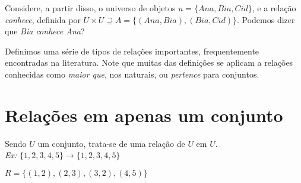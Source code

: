 Considere, a partir disso, o universo de objetos $u = \{Ana, Bia, Cid\}$, e a relação \textit{conhece}, definida por $U\times U \supseteq A = \{(Ana, Bia), (Bia, Cid)\}$. Podemos dizer que \textit{Bia conhece Ana}?



\theoremstyle{definition}
\newtheorem{definition}{Definição}[section]


\theoremstyle{plain}
\newtheorem{theorem}{Proposição}[section]


Definimos uma série de tipos de relações importantes, frequentemente encontradas na literatura.
Note que muitas das definições se aplicam a relações conhecidas como \textit{maior que}, nos naturais, ou \textit{pertence} para conjuntos.

\section{Relações em apenas um conjunto}

Sendo $U$ um conjunto, trata-se de uma relação de $U$ em $U$.\\

\textit{Ex:} $\{1,2,3,4,5\} \rightarrow  \{1,2,3,4,5\}$

$R = \{(1,2),(2,3),(3,2),(4,5)\}$

